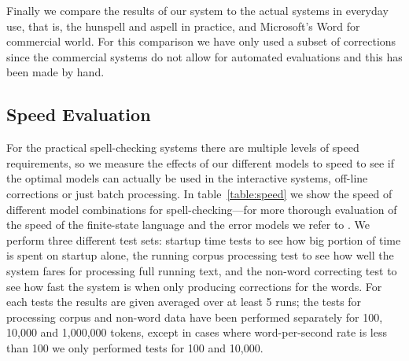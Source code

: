 \documentclass[a4paper,12pt]{article}
\begin{document}
%

Finally we compare the results of our system to the actual systems in everyday
use, that is, the hunspell and aspell in practice, and Microsoft's Word for
commercial world. For this comparison we have only used a subset of corrections
since the commercial systems do not allow for automated evaluations and
this has been made by hand. 

%


\subsection{Speed Evaluation}

For the practical spell-checking systems there are multiple levels of speed
requirements, so we measure the effects of our different models to speed to see
if the optimal models can actually be used in the interactive systems, off-line
corrections or just batch processing. In table~\ref{table:speed} we
show the speed of different model combinations for spell-checking---for more
thorough evaluation of the speed of the finite-state language and the error
models we refer to \cite{pirinen2012improving}. We perform three different test
sets: startup time tests to see how big portion of time is spent on startup
alone, the running corpus processing test to see how well the system fares for
processing full running text, and the non-word correcting test to see how fast
the system is when only producing corrections for the words. For each tests
the results are given averaged over at least 5 runs; the tests for processing
corpus and non-word data have been performed separately for 100, 10,000 and
1,000,000 tokens, except in cases where word-per-second rate is less than 100
we only performed tests for 100 and 10,000.
\end{document}
